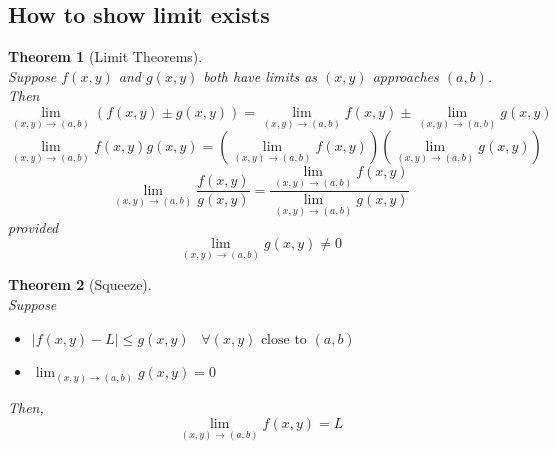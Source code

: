 \documentclass[12pt]{article}
\newtheorem{theorem}{Theorem}[section]
\theoremstyle{definition}
\begin{document}
\subsection{How to show limit exists}
\begin{center}
\end{center}
\begin{theorem}[Limit Theorems]\hfill\\\normalfont Suppose $f(x,y)$ and $g(x,y)$ both have limits as $(x,y)$ approaches $(a,b)$. Then
\[
\lim_{(x,y)\to (a,b)}(f(x,y)\pm g(x,y))=\lim_{(x,y)\to (a,b)}f(x,y)\pm\lim_{(x,y)\to (a,b)}g(x,y)
\]
\[
\lim_{(x,y)\to (a,b)}f(x,y)g(x,y)=\left(\lim_{(x,y)\to (a,b)}f(x,y)\right)\left(\lim_{(x,y)\to (a,b)}g(x,y)\right)
\]
\[
\lim_{(x,y)\to (a,b)}\frac{f(x,y)}{ g(x,y)}=\frac{\lim_{(x,y)\to (a,b)}f(x,y)}{\lim_{(x,y)\to (a,b)}g(x,y)}
\]
provided
\[
\lim_{(x,y)\to (a,b)}g(x,y)\neq 0
\]
\end{theorem}
\begin{theorem}[Squeeze]\hfill\\\normalfont Suppose
\begin{itemize}
  \item $|f(x,y)-L|\leq g(x,y)\;\;\;\forall (x,y)\text{ close to }(a,b)$
  \item $\lim_{(x,y)\to (a,b)}g(x,y)=0$
\end{itemize}
Then,
\[
\lim_{(x,y)\to (a,b)}f(x,y)=L
\]
\end{theorem}
\end{document}
